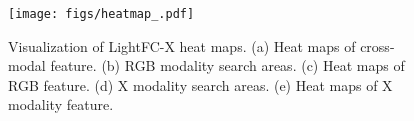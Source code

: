 \begin{figure}
\centering
\texttt{[image: figs/heatmap\_.pdf]}
\caption{Visualization of LightFC-X heat maps. (a) Heat maps of cross-modal feature. (b) RGB modality search areas. (c) Heat maps of RGB feature. (d) X modality search areas. (e) Heat maps of X modality feature.}
\label{fig: heatmap}
\end{figure}
